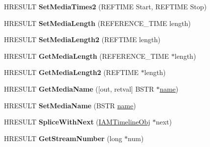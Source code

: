 \begin{DoxyCompactItemize}
H\+R\+E\+S\+U\+LT {\bfseries Set\+Media\+Times2} (R\+E\+F\+T\+I\+ME Start, R\+E\+F\+T\+I\+ME Stop)
\item 
\mbox{\label{interface_i_a_m_timeline_src_a5e3c4d6fb6b4060c9bee4159cb27da6d}} 
H\+R\+E\+S\+U\+LT {\bfseries Set\+Media\+Length} (R\+E\+F\+E\+R\+E\+N\+C\+E\+\_\+\+T\+I\+ME length)
\item 
\mbox{\label{interface_i_a_m_timeline_src_a065b99050ff560aa15d9a2c5284f2d27}} 
H\+R\+E\+S\+U\+LT {\bfseries Set\+Media\+Length2} (R\+E\+F\+T\+I\+ME length)
\item 
\mbox{\label{interface_i_a_m_timeline_src_a646ab1ea4b964a1052dfd61f8695db3e}} 
H\+R\+E\+S\+U\+LT {\bfseries Get\+Media\+Length} (R\+E\+F\+E\+R\+E\+N\+C\+E\+\_\+\+T\+I\+ME $\ast$length)
\item 
\mbox{\label{interface_i_a_m_timeline_src_af850ad81162058a0207d101c4dda532d}} 
H\+R\+E\+S\+U\+LT {\bfseries Get\+Media\+Length2} (R\+E\+F\+T\+I\+ME $\ast$length)
\item 
\mbox{\label{interface_i_a_m_timeline_src_ad8182e57bc049f6d4700d1214a434699}} 
H\+R\+E\+S\+U\+LT {\bfseries Get\+Media\+Name} (\mbox{[}out, retval\mbox{]} B\+S\+TR $\ast$\hyperlink{structname}{name})
\item 
\mbox{\label{interface_i_a_m_timeline_src_ab8e2dd9005680cd966b0c1da0b45e97b}} 
H\+R\+E\+S\+U\+LT {\bfseries Set\+Media\+Name} (B\+S\+TR \hyperlink{structname}{name})
\item 
\mbox{\label{interface_i_a_m_timeline_src_abb6524edcf724a0c20ee8f75e2c814dc}} 
H\+R\+E\+S\+U\+LT {\bfseries Splice\+With\+Next} (\hyperlink{interface_i_a_m_timeline_obj}{I\+A\+M\+Timeline\+Obj} $\ast$next)
\item 
\mbox{\label{interface_i_a_m_timeline_src_a9bc13a4ee9d2cf40589b534274bec9c9}} 
H\+R\+E\+S\+U\+LT {\bfseries Get\+Stream\+Number} (long $\ast$num)
\item 
\mbox{\label{interface_i_a_m_timeline_src_a9098f65a2a1c047f1aca687b2f06f8ec}} 

\end{DoxyCompactItemize}
